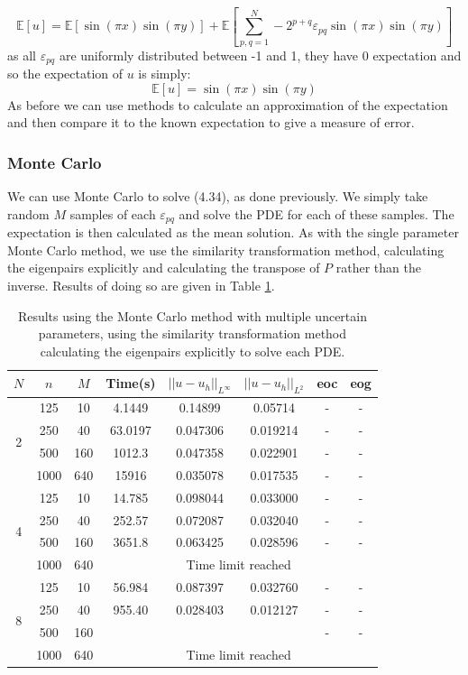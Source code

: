 \documentclass[11pt]{article}
\numberwithin{equation}{section}
\begin{document}
\begin{equation}
\mathbb{E}[u] = \mathbb{E}[\sin(\pi x)\sin(\pi y)] + \mathbb{E}\left[\sum_{p,q=1}^N -2^{p+q} \varepsilon_{pq} \sin(\pi x)\sin(\pi y) \right]
\end{equation}
as all $\varepsilon_{pq}$ are uniformly distributed between -1 and 1, they have 0 expectation and so the expectation of $u$ is simply:
\begin{equation}
\mathbb{E}[u] = \sin(\pi x)\sin(\pi y)
\end{equation}
As before we can use methods to calculate an approximation of the expectation and then compare it to the known expectation to give a measure of error.


\subsubsection{Monte Carlo}
We can use Monte Carlo to solve (4.34), as done previously. We simply take random $M$ samples of each $\varepsilon_{pq}$ and solve the PDE for each of these samples. The expectation is then calculated as the mean solution. As with the single parameter Monte Carlo method, we use the similarity transformation method, calculating the eigenpairs explicitly and calculating the transpose of $P$ rather than the inverse. Results of doing so are given in Table \ref{table:monte carlo multiple}.

\begin{table}[H]
\centering
\begin{tabular}{|c|c|c|c|c|c|c|c|}
\hline
$N$ & $n$ & $M$ & Time(s) & $|| u - u_h ||_{L^{\infty}}$ & $|| u - u_h ||_{L^{2}}$ & eoc & eog \\
\hline
\multirow{4}{*}{2} & 125 & 10  & 4.1449 & 0.14899 & 0.05714 & - & - \\
& 250 & 40 & 63.0197 & 0.047306 & 0.019214 & - & - \\
& 500 & 160 & 1012.3 & 0.047358 & 0.022901 & - & - \\
& 1000 & 640 & 15916 & 0.035078 & 0.017535 & - & - \\
\hline
\multirow{4}{*}{4} & 125 & 10 & 14.785 & 0.098044 & 0.033000 & - & - \\
& 250 & 40 & 252.57 & 0.072087 & 0.032040 & - & - \\
& 500 & 160 & 3651.8 & 0.063425 & 0.028596 & - & - \\
\cline{4-8}
& 1000 & 640 & \multicolumn{5}{c|}{Time limit reached} \\
\hline
\multirow{4}{*}{8} & 125 & 10 & 56.984 & 0.087397 & 0.032760 & - & - \\
& 250 & 40 & 955.40 & 0.028403 & 0.012127 & - & - \\
& 500 & 160 & & & & - & - \\
\cline{4-8}
& 1000 & 640 & \multicolumn{5}{c|}{Time limit reached} \\
\hline
\end{tabular}
\captionsetup{justification=centering}
\caption{Results using the Monte Carlo method with multiple uncertain parameters, using the similarity transformation method calculating the eigenpairs explicitly to solve each PDE.}
\label{table:monte carlo multiple}
\end{table}
\end{document}
